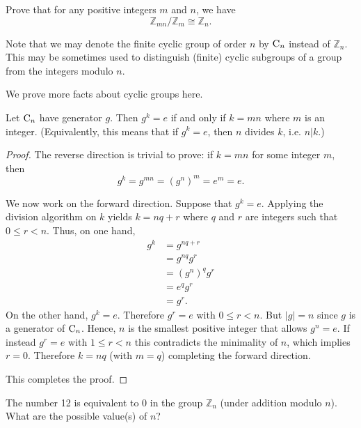 \begin{exercise}\label{exercise-Zmn-mod-Zn-cong-Zn}
    Prove that for any positive integers $m$ and $n$, we have
    \[
        \mathbb{Z}_{mn} / \mathbb{Z}_m \cong \mathbb{Z}_n.
    \]
\end{exercise}

Note that we may denote the finite cyclic group of order $n$ by $\mathrm{C}_{n}$ instead of $\mathbb{Z}_n$. This may be sometimes used to distinguish (finite) cyclic subgroups of a group from the integers modulo $n$.

\newpage

We prove more facts about cyclic groups here.
\begin{lemma}\label{lemma-order-of-an-element-that-is-equivalent-to-identity}
    Let $\mathrm{C}_{n}$ have generator $g$. Then $g^k = e$ if and only if $k = mn$ where $m$ is an integer.\newline
    (Equivalently, this means that if $g^k = e$, then $n$ divides $k$, i.e. $n | k$.)
\end{lemma}
\begin{proof}
    The reverse direction is trivial to prove: if $k = mn$ for some integer $m$, then
    \[
        g^k = g^{mn} = \left(g^n\right)^m = e^m = e.
    \]

    We now work on the forward direction. Suppose that $g^k = e$. Applying the division algorithm on $k$ yields $k = nq + r$ where $q$ and $r$ are integers such that $0 \leq r < n$. Thus, on one hand,
    \begin{align*}
        g^k &= g^{nq+r}\\
        &= g^{nq}g^r\\
        &= \left(g^n\right)^qg^r\\
        &= e^qg^r\\
        &= g^r.
    \end{align*}
    On the other hand, $g^k = e$. Therefore $g^r = e$ with $0 \leq r < n$. But $|g| = n$ since $g$ is a generator of $\mathrm{C}_{n}$. Hence, $n$ is the smallest positive integer that allows $g^n = e$. If instead $g^r = e$ with $1 \leq r < n$ this contradicts the minimality of $n$, which implies $r = 0$. Therefore $k = nq$ (with $m = q$) completing the forward direction.

    This completes the proof.
\end{proof}

\begin{exercise}
    The number 12 is equivalent to 0 in the group $\mathbb{Z}_n$ (under addition modulo $n$). What are the possible value(s) of $n$?
\end{exercise}

